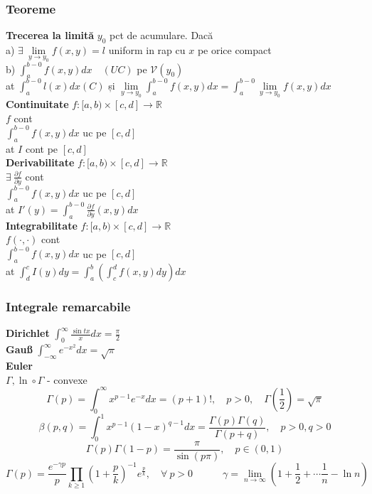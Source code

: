 \documentclass{article}
\newcommand{\parti}[2]{\frac{\partial #1}{ \partial #2}}
\newcommand*{\R}{\mathbb{R}}
\newcommand*{\fint}[1]{\int_{a}^{b-0} #1(x) dx}
\newcommand*{\fintxy}[1]{\int_{a}^{b-0} #1(x,y) dx}
\begin{document}
\subsubsection*{Teoreme}
\textbf{Trecerea la limită} $y_0$ pct de acumulare. Dacă\\
\quad a)  $\exists\ \lim\limits_{y\to y_0}f(x,y) =l$ uniform in rap cu $x$ pe orice compact\\
\quad b) $\fintxy{f} \quad (UC)$ pe $\mathcal{V}(y_0)$\\
at $\fint{l} (C)$ și $\lim\limits_{y \to y_0} \fintxy{f} = \fintxy{\lim\limits_{y \to y_0}f}$
\\
\textbf{Continuitate} $f: [a, b) \times [c, d]\to \R$\\
$f$ cont\\
$\fintxy{f}$ uc pe $[c, d]$\\
at $I$ cont pe $[c,d]$
\\
\textbf{Derivabilitate} $f: [a, b) \times [c, d]\to \R$\\
$\exists\ \parti{f}{y}$ cont\\
$\fintxy{f}$ uc pe $[c, d]$\\
at $I'(y) = \fintxy{\parti{f}{y}}$
\\
\textbf{Integrabilitate} $f: [a, b) \times [c, d]\to \R$\\
$f(\cdot,\cdot)$ cont\\
$\fintxy{f}$ uc pe $[c, d]$\\
at $\int_d^c I(y) dy = \int_a^b\left( \int_c^d f(x,y) dy \right)dx$

\subsubsection*{Integrale remarcabile}
\textbf{Dirichlet} $\int_0^\infty \frac{\sin tx}{x}dx = \frac{\pi}{2}$\\
\textbf{Gauß} $\int_{-\infty}^\infty e^{-x^2}dx=\sqrt{\pi}$\\
\textbf{Euler}\\
$\Gamma, \ln \circ \Gamma $ - convexe 
\[ \Gamma(p) = \int_0^{\infty} x^{p-1}e^{-x}dx = (p+1)!, \quad p > 0, \quad \Gamma\left(\frac{1}{2}\right) = \sqrt{\pi}  \]
\[ \beta(p, q) = \int_0^{1} x^{p-1}(1-x)^{q-1}dx = \frac{\Gamma(p)\Gamma(q)}{\Gamma(p+q)}, \quad p > 0, q > 0 \]
\[ \Gamma(p)\Gamma(1-p)= \frac{\pi}{\sin(p\pi)}, \quad p \in (0, 1) \]
\[ \Gamma(p) = \frac{e^{-\gamma p}}{p} \prod_{k\geq 1}
  \left(1+\frac{p}{k}\right)^{-1} e^{\frac{p}{k}}, \quad \forall\ p>0\quad\quad
\quad \gamma = \lim\limits_{n\to\infty} (1+\frac{1}{2}+\cdots\frac{1}{n}- \ln n)
\]
\end{document}
